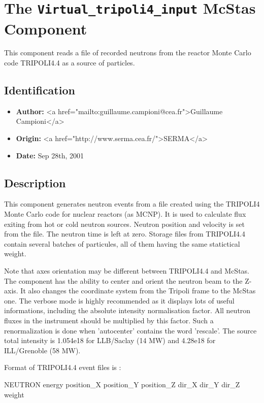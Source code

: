 \section{The \texttt{Virtual\_tripoli4\_input} McStas Component}
This component reads a file of recorded neutrons from the reactor Monte Carlo
code TRIPOLI4.4 as a source of particles.

\subsection*{Identification}
\begin{itemize}
  \item \textbf{Author:} \textless{}a href="mailto:guillaume.campioni@cea.fr"\textgreater{}Guillaume Campioni\textless{}/a\textgreater{}
  \item \textbf{Origin:} \textless{}a href="http://www.serma.cea.fr/"\textgreater{}SERMA\textless{}/a\textgreater{}
  \item \textbf{Date:} Sep 28th, 2001
\end{itemize}

\subsection*{Description}
This component generates neutron events from a file created using the TRIPOLI4 Monte Carlo code for nuclear reactors (as MCNP). It is used to calculate flux exiting from hot or cold neutron sources. Neutron position and velocity is set from the file. The neutron time is left at zero. Storage files from TRIPOLI4.4 contain several batches of particules, all of them having the same statictical weight.

Note that axes orientation may be different between TRIPOLI4.4 and McStas. The component has the ability to center and orient the neutron beam to the Z-axis. It also changes the coordinate system from the Tripoli frame to the McStas one. The verbose mode is highly recommended as it displays lots of useful informations, including the absolute intensity normalisation factor. All neutron fluxes in the instrument should be multiplied by this factor. Such a renormalization is done when 'autocenter' contains the word 'rescale'. The source total intensity is 1.054e18 for LLB/Saclay (14 MW) and 4.28e18 for ILL/Grenoble (58 MW).

Format of TRIPOLI4.4 event files is :

NEUTRON energy position\_X position\_Y position\_Z dir\_X dir\_Y dir\_Z weight

